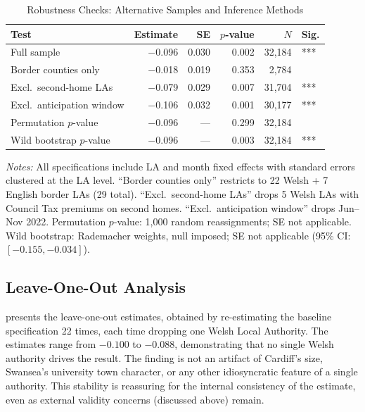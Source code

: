 \documentclass[12pt]{article}
\begin{document}
\begin{table}[H]
\centering
\caption{Robustness Checks: Alternative Samples and Inference Methods}
\label{tab:robustness}
\begin{threeparttable}
\begin{tabular}{lrrrrl}
\toprule
Test & Estimate & SE & $p$-value & $N$ & Sig. \\
\midrule
Full sample & $-$0.096 & 0.030 & 0.002 & 32,184 & *** \\
Border counties only & $-$0.018 & 0.019 & 0.353 & 2,784 & \\
Excl.\ second-home LAs & $-$0.079 & 0.029 & 0.007 & 31,704 & *** \\
Excl.\ anticipation window & $-$0.106 & 0.032 & 0.001 & 30,177 & *** \\
Permutation $p$-value & $-$0.096 & --- & 0.299 & 32,184 & \\
Wild bootstrap $p$-value & $-$0.096 & --- & 0.003 & 32,184 & *** \\
\bottomrule
\end{tabular}
\begin{tablenotes}[flushleft]
\small
\item \textit{Notes:} All specifications include LA and month fixed effects with standard errors clustered at the LA level. ``Border counties only'' restricts to 22 Welsh + 7 English border LAs (29 total). ``Excl.\ second-home LAs'' drops 5 Welsh LAs with Council Tax premiums on second homes. ``Excl.\ anticipation window'' drops Jun--Nov 2022. Permutation $p$-value: 1,000 random reassignments; SE not applicable. Wild bootstrap: Rademacher weights, null imposed; SE not applicable (95\% CI: $[-0.155, -0.034]$).
\end{tablenotes}
\end{threeparttable}
\end{table}

\subsection{Leave-One-Out Analysis}

 presents the leave-one-out estimates, obtained by re-estimating the baseline specification 22 times, each time dropping one Welsh Local Authority. The estimates range from $-0.100$ to $-0.088$, demonstrating that no single Welsh authority drives the result. The finding is not an artifact of Cardiff's size, Swansea's university town character, or any other idiosyncratic feature of a single authority. This stability is reassuring for the internal consistency of the estimate, even as external validity concerns (discussed above) remain.
\end{document}
